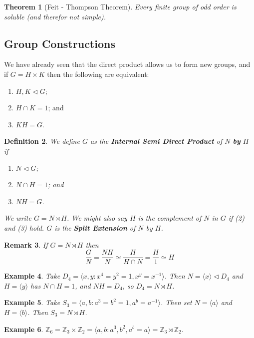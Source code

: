 \documentclass[a4paper,10pt]{article}
\newcommand{\ZZ}{\mathbb{Z}}
\newtheorem{thm}{Theorem}
\newtheorem{Def}[thm]{Definition}
\newtheorem{eg}[thm]{Example}
\newtheorem{rem}[thm]{Remark}
\begin{document}
\begin{thm}[Feit - Thompson Theorem]
Every finite group of odd order is soluble (and therefor not simple).
\end{thm}



\subsection{Group Constructions}

We have already seen that the direct product allows us to form new groups, and if $G = H \times K$ then the following are equivalent:\begin{enumerate}
\item $H, K \triangleleft G$;
\item $H \cap K = 1$; and
\item $KH = G$. 
\end{enumerate}

\begin{Def}
We define $G$ as the \textbf{Internal Semi Direct Product} of $N$ \textbf{by} $H$ if
\begin{enumerate}
\item $N \triangleleft G$;
\item $N \cap H = 1$; and
\item $NH = G$. 
\end{enumerate}
We write $G = N \rtimes H$. We might also say $H$ is the complement of $N$ in $G$ if (2) and (3) hold. $G$ is the \textbf{Split Extension} of $N$ by $H$.
\end{Def}

\begin{rem}
If $G = N \rtimes H$ then
\[ \frac{G}{N} = \frac{NH}{N} \simeq \frac{H}{H \cap N} = \frac{H}{1} \simeq H\]
\end{rem}


\begin{eg}
Take $D_4 = \langle x,y : x^4 = y^2 = 1, x^y = x^{-1} \rangle$. Then $N = \langle x \rangle  \triangleleft D_4$ and $H = \langle y \rangle$ has $N \cap H = 1$, and $NH = D_4$, so $D_4 = N \rtimes H$.
\end{eg}

\begin{eg}
Take $S_3 = \langle a,b : a^3 = b^2 = 1, a^b = a^{-1} \rangle$. Then set $N = \langle a \rangle$ and $H = \langle b \rangle$. Then $S_3 = N \rtimes H$. 
\end{eg}

\begin{eg}
$\ZZ_6 = \ZZ_3 \times \ZZ_2 = \langle a,b : a^3, b^2, a^b = a \rangle = \ZZ_3 \rtimes \ZZ_2$. 
\end{eg}
\end{document}
